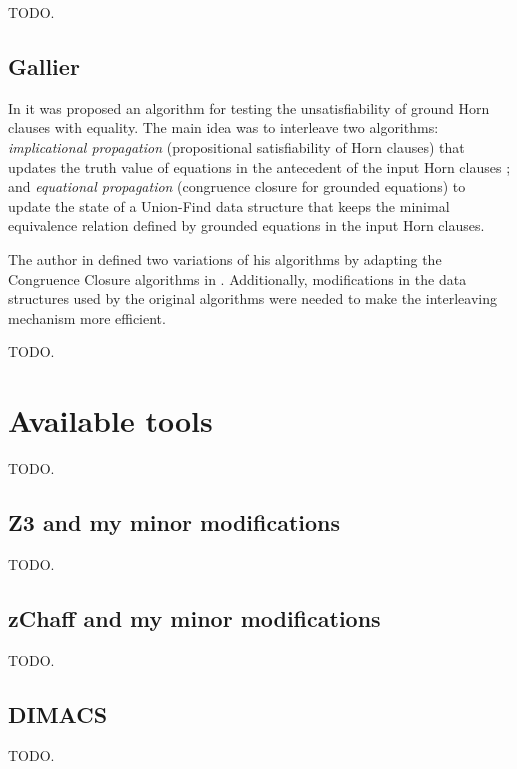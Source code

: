 TODO.

\subsection{Gallier}

In \cite{GALLIER1987233} it was proposed an algorithm for testing the unsatisfiability
of ground Horn clauses with equality. The main idea was to interleave two algorithms: \emph{implicational propagation}
(propositional satisfiability of Horn clauses) that updates the truth value of equations
in the antecedent of the input Horn clauses \cite{DOWLING1984267}; and \emph{equational propagation} (congruence closure
for grounded equations) to update the state of a Union-Find data structure \cite{10.1145/364099.364331}
that keeps the minimal equivalence relation defined by grounded equations in the input Horn clauses.

The author in \cite{GALLIER1987233} defined two variations of his algorithms by adapting
the Congruence Closure algorithms in \cite{10.1145/322217.322228, 10.1145/322186.322198}.
Additionally, modifications in the data structures used by the original algorithms were needed
to make the interleaving mechanism more efficient.

TODO.

\section{Available tools}


TODO.

\subsection{Z3 and my minor modifications}

TODO.

\subsection{zChaff and my minor modifications}

TODO.

\subsection{DIMACS}

TODO.

